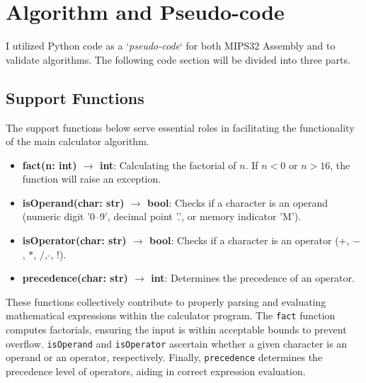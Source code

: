 \section{Algorithm and Pseudo-code}

\label{2.Algorithm and PseudoCode}

I utilized Python code as a `\textit{pseudo-code}` for both MIPS32 Assembly and to validate algorithms. The following code section will be divided into three parts.

\subsection{Support Functions}
    The support functions below serve essential roles in facilitating the functionality of the main calculator algorithm.
    
    \begin{itemize}
        \item \textbf{fact(n: int) $\rightarrow$ int}: Calculating the factorial of \(n\). If \(n < 0\) or \(n > 16\), the function will raise an exception.
        
        \item \textbf{isOperand(char: str) $\rightarrow$ bool}: Checks if a character is an operand (numeric digit '0--9', decimal point '.', or memory indicator 'M').
        
        \item \textbf{isOperator(char: str) $\rightarrow$ bool}: Checks if a character is an operator (\(+\), \(-\), \(*\), \(/\), \(\hat{}\), \(!\)).
        
        \item \textbf{precedence(char: str) $\rightarrow$ int}: Determines the precedence of an operator.
    \end{itemize}
    
    These functions collectively contribute to properly parsing and evaluating mathematical expressions within the calculator program. The \texttt{fact} function computes factorials, ensuring the input is within acceptable bounds to prevent overflow. \texttt{isOperand} and \texttt{isOperator} ascertain whether a given character is an operand or an operator, respectively. Finally, \texttt{precedence} determines the precedence level of operators, aiding in correct expression evaluation.
        
